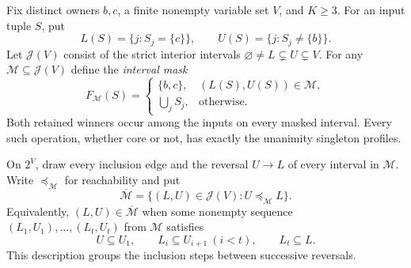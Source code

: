 Fix distinct owners $b,c$, a finite nonempty variable set $V$, and
$K\geq3$. For an input tuple $S$, put
\[
 L(S)=\{j:S_j=\{c\}\},\qquad
 U(S)=\{j:S_j\ne\{b\}\}.
\]
Let $\mathcal J(V)$ consist of the strict interior intervals
$\varnothing\ne L\subsetneq U\subsetneq V$. For any
$\mathcal M\subseteq\mathcal J(V)$ define the \emph{interval mask}
\[
 F_{\mathcal M}(S)=
 \begin{cases}
  \{b,c\},&(L(S),U(S))\in\mathcal M,\\
  \displaystyle\bigcup_jS_j,&\text{otherwise}.
 \end{cases}
\]
Both retained winners occur among the inputs on every masked interval.
Every such operation, whether core or not, has exactly the unanimity
singleton profiles.

On $2^V$, draw every inclusion edge and the reversal $U\to L$ of every
interval in $\mathcal M$. Write $\preceq_{\mathcal M}$ for reachability
and put
\[
 \overline{\mathcal M}=
 \{(L,U)\in\mathcal J(V):U\preceq_{\mathcal M}L\}.
\]
Equivalently, $(L,U)\in\overline{\mathcal M}$ when some nonempty
sequence $(L_1,U_1),\ldots,(L_t,U_t)$ from $\mathcal M$ satisfies
\begin{equation}\label{core:eq:interval-mask-path}
 U\subseteq U_1,\qquad L_i\subseteq U_{i+1}\ (i<t),\qquad L_t\subseteq L.
\end{equation}
This description groups the inclusion steps between successive reversals.

